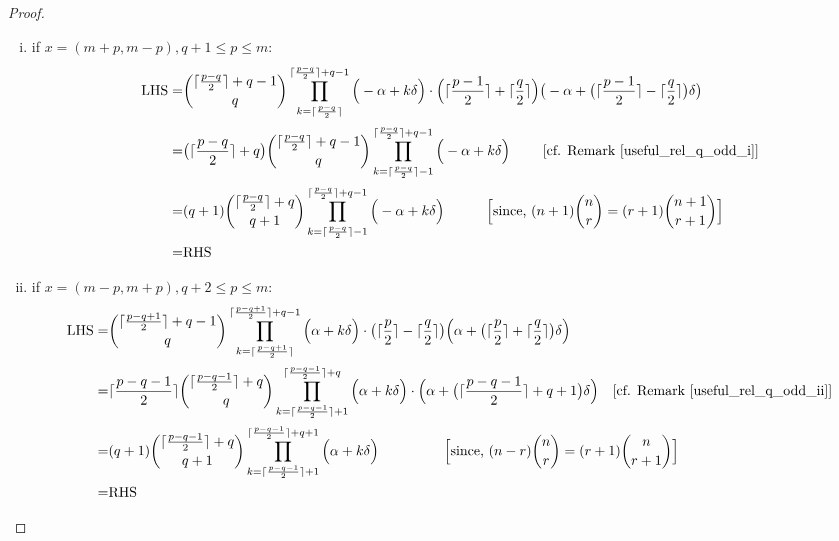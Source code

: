 \documentclass[10pt, a4paper, reqno]{amsart}
\begin{document}
\begin{proof}
	\begin{enumerate}[(i)]
	\item if $x=(m+p,m-p), q+1\leq p\leq m$:
		\[\begin{split}
		\text{LHS}
		=& \displaystyle	\binom{\lceil \frac{p-q}{2} \rceil + q-1}{\,q\,}\prod_{k=\lceil \frac{p-q}{2} \rceil}^{\lceil \frac{p-q}{2} \rceil +q-1}\Big(-\alpha +k\delta\Big)  \cdot\Big( \lceil \frac{p-1}{2} \rceil +\lceil \frac{q}{2} \rceil\Big) \big(-\alpha +\big(\lceil \frac{p-1}{2} \rceil -\lceil \frac{q}{2} \rceil\big)\delta\big)     \\
		=&  \displaystyle       \big(\lceil\frac{p-q}{2}\rceil+q\big)           \binom{\lceil \frac{p-q}{2} \rceil + q-1}{\,q\,}              \prod_{k=\lceil \frac{p-q}{2} \rceil -1}^{\lceil \frac{p-q}{2} \rceil +q-1}\Big(-\alpha +k\delta\Big)        \text{ ~~~~~~[cf. Remark \ref{useful_rel_q_odd_i}]}  \\
		=&(q+1) \displaystyle	\binom{\lceil \frac{p-q}{2} \rceil + q}{\,q+1\,}\prod_{k=\lceil \frac{p-q}{2} \rceil -1}^{\lceil \frac{p-q}{2} \rceil +q-1}\Big(-\alpha +k\delta\Big)  ~~~~~~~~~ \text{\Big [since, $(n+1)\binom{n}{r}=(r+1)\binom{n+1}{r+1}$\Big]}   \\
		=&\text{RHS}
	\end{split}\]
	
		\item if $x=(m-p,m+p), q+2\leq p\leq m$:
		\[\begin{split}
			\text{LHS}=&\displaystyle\binom{\lceil \frac{p-q+1}{2} \rceil+ q-1}{\,q\,}\prod_{k=\lceil \frac{p-q+1}{2} \rceil}^{\lceil \frac{p-q+1}{2} \rceil+q-1 }\Big(\alpha+k\delta \Big)\cdot  \big( \lceil\frac{p}{2}\rceil-\lceil\frac{q}{2}\rceil \big)\Big(\alpha+\big(\lceil\frac{p}{2}\rceil+\lceil\frac{q}{2}\rceil \big)\delta \Big)\\
			=&\displaystyle \lceil \frac{p-q-1}{2} \rceil\binom{\lceil \frac{p-q-1}{2} \rceil+q }{\,q\,}\prod_{k=\lceil \frac{p-q-1}{2} \rceil+1}^{\lceil \frac{p-q-1}{2} \rceil+q }\Big(\alpha+k\delta \Big)\cdot  \Big(\alpha+\big(\lceil \frac{p-q-1}{2} \rceil +q+1 \big)\delta \Big)       \text{ ~~[cf. Remark \ref{useful_rel_q_odd_ii}]} \\
			=&(q+1)\displaystyle	\binom{\lceil \frac{p-q-1}{2} \rceil + q}{\,q+1\,}\prod_{k=\lceil \frac{p-q-1}{2} \rceil +1}^{\lceil \frac{p-q-1}{2} \rceil +q+1}\Big(\alpha +k\delta\Big)  ~~~~~~~~~  ~~~~~ \text{\Big [since, $(n-r)\binom{n}{r}=(r+1)\binom{n}{r+1}$\Big]}   \\
			=&\text{RHS}
		\end{split}\]
\end{enumerate}
	\end{proof}
\end{document}
